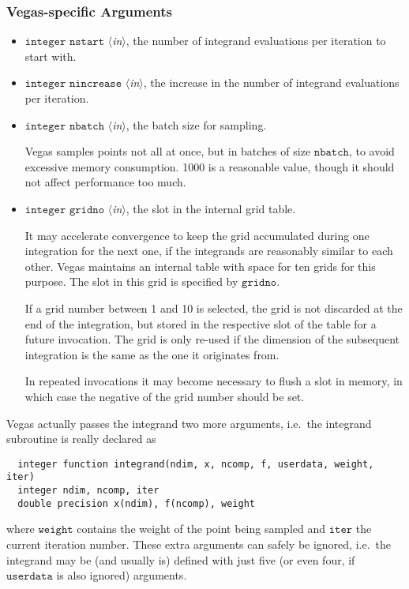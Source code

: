 \documentclass[12pt]{article}
\newcommand\ie{i.e.\ }
\newcommand\Code[1]{\ensuremath{\texttt{#1}}}
\newcommand\VarIn[1]{\item\Code{#1} \textit{$\langle$in\/$\rangle$},}
\begin{document}
\subsubsection{Vegas-specific Arguments}
\label{sect:vegasargs}

\begin{itemize}
\VarIn{integer nstart}
the number of integrand evaluations per iteration to start with.

\VarIn{integer nincrease}
the increase in the number of integrand evaluations per iteration.

\VarIn{integer nbatch}
the batch size for sampling.

Vegas samples points not all at once, but in batches of size
\Code{nbatch}, to avoid excessive memory consumption.  1000 is a
reasonable value, though it should not affect performance too much.

\VarIn{integer gridno}
the slot in the internal grid table.

It may accelerate convergence to keep the grid accumulated during one
integration for the next one, if the integrands are reasonably similar 
to each other.  Vegas maintains an internal table with space for ten
grids for this purpose.  The slot in this grid is specified by
\Code{gridno}.

If a grid number between 1 and 10 is selected, the grid is not discarded
at the end of the integration, but stored in the respective slot of the 
table for a future invocation.  The grid is only re-used if the 
dimension of the subsequent integration is the same as the one it 
originates from.

In repeated invocations it may become necessary to flush a slot in
memory, in which case the negative of the grid number should be set.
\end{itemize}

Vegas actually passes the integrand two more arguments, \ie the 
integrand subroutine is really declared as
\begin{verbatim}
  integer function integrand(ndim, x, ncomp, f, userdata, weight, iter)
  integer ndim, ncomp, iter
  double precision x(ndim), f(ncomp), weight
\end{verbatim}
where \Code{weight} contains the weight of the point being sampled and
\Code{iter} the current iteration number.  These extra arguments can
safely be ignored, \ie the integrand may be (and usually is) defined
with just five (or even four, if \Code{userdata} is also ignored) 
arguments.
\end{document}
